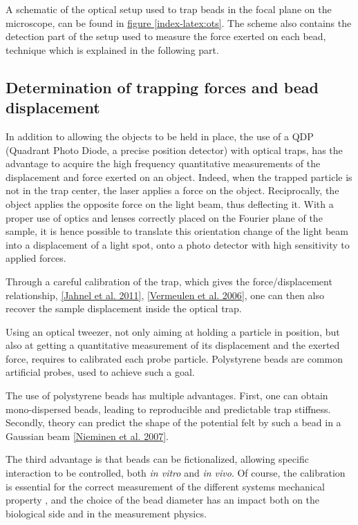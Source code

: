 \documentclass[A4paperpaper,11pt,english]{sphinxmanual}
\begin{document}
A schematic of the optical setup used to trap beads in the focal
plane on the microscope, can be found in \hyperref[index-latex:ots]{figure  \ref*{index-latex:ots}}. The scheme also
contains the detection part of the setup used to measure the force
exerted on each bead, technique which is explained in the following part.


\subsection{Determination of trapping forces and bead displacement}
\label{index-latex:determination-of-trapping-forces-and-bead-displacement}
In addition to allowing the objects to be held in place, the use of a QDP
(Quadrant Photo Diode, a precise position detector) with optical traps, has the
advantage to acquire the high frequency quantitative measurements of the
displacement and force exerted on an object.  Indeed, when the trapped particle
is not in the trap center, the laser applies a force on the object.
Reciprocally, the object applies the opposite force on the light beam, thus
deflecting it.  With a proper use of optics and lenses correctly placed on the
Fourier plane of the sample, it is hence possible to translate this orientation
change of the light  beam into a displacement of a light spot, onto a photo
detector with high sensitivity to applied forces.

Through a careful calibration of the trap, which gives the force/displacement
relationship, {\hyperref[index-latex:jahnel2011]{{[}Jahnel et al. 2011{]}}}, {\hyperref[index-latex:vermeulen2006]{{[}Vermeulen et al. 2006{]}}}, one can then also
recover the sample displacement inside the optical trap.

Using an optical tweezer, not only aiming at holding a particle in position, but also at getting a
quantitative measurement of its displacement and the exerted force, requires to
calibrated each probe particle. Polystyrene beads are common artificial probes,
used to achieve such a goal.

The use of polystyrene beads has multiple advantages. First, one
can obtain mono-dispersed beads, leading to reproducible and predictable trap
stiffness. Secondly, theory can predict the shape of
the potential felt by such a bead in a Gaussian beam {\hyperref[index-latex:nieminen2007]{{[}Nieminen et al. 2007{]}}}.

The third advantage is that beads can be fictionalized, allowing specific
interaction to be controlled, both \emph{in vitro} and \emph{in vivo}. Of course, the
calibration is essential for the correct measurement of the different systems mechanical property
, and the choice of the bead diameter has an impact both on
the biological side and in the measurement physics.
\label{index-latex:part2}
\end{document}
